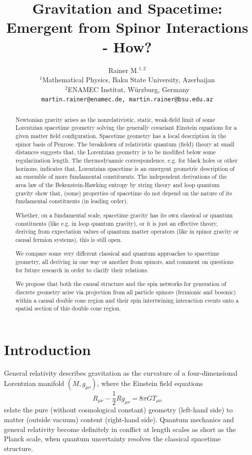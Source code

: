 \documentclass[11pt,a4paper]{article}
\title{Gravitation and Spacetime: Emergent from Spinor Interactions - How?}
\author{Rainer M.$^{1,2}$\\
	\small $^1$Mathematical Physics, Baku State University, Azerbaijan\\
	\small $^2$ENAMEC Institut, Würzburg, Germany\\
	\small \texttt{martin.rainer@enamec.de, martin.rainer@bsu.edu.az}}
\date{}
\theoremstyle{definition}
\begin{document}
	
	\maketitle
	
	\begin{abstract}
		Newtonian gravity arises as the nonrelativistic, static, weak-field limit of some Lorentzian spacetime geometry solving the generally covariant Einstein equations for a given matter field configuration. Spacetime geometry has a local description in the spinor basis of Penrose. The breakdown of relativistic quantum (field) theory at small distances suggests that, the Lorentzian geometry is to be modified below some regularization length. The thermodynamic correspondence, e.g. for black holes or other horizons, indicates that, Lorentzian spacetime is an emergent geometric description of an ensemble of more fundamental constituents. The independent derivations of the area law of the Bekenstein-Hawking entropy by string theory and loop quantum gravity show that, (some) properties of spacetime do not depend on the nature of its fundamental constituents (in leading order).
		
		Whether, on a fundamental scale, spacetime gravity has its own classical or quantum constituents (like e.g. in loop quantum gravity), or it is just an effective theory, deriving from expectation values of quantum matter operators (like in spinor gravity or causal fermion systems), this is still open. 
		
		We compare some very different classical and quantum approaches to spacetime geometry, all deriving in one way or another from spinors, and comment on questions for future research in order to clarify their relations.
		
		We propose that both the causal structure and the spin networks for generation of discrete geometry arise via projection from all particle spinors (fermionic and bosonic) within a causal double cone region and their spin intertwining interaction events onto a spatial section of this double cone region.   
		
	\end{abstract}
	
	\section{Introduction}
	
	General relativity describes gravitation as the curvature of a four-dimensional Lorentzian manifold $(M, g_{\mu\nu})$, where the Einstein field equations
	\begin{equation}
		R_{\mu\nu} - \frac{1}{2}R g_{\mu\nu}  = 8\pi G T_{\mu\nu}
		\label{eq:einstein}
	\end{equation}
	relate the pure (without cosmological constant) geometry (left-hand side)  to matter (outside vacuum) content (right-hand side).  Quantum mechanics and general relativity become definitely in conflict at length scales as short as the Planck scale, when quantum uncertainty resolves the classical spacetime structure.
	
\end{document}
